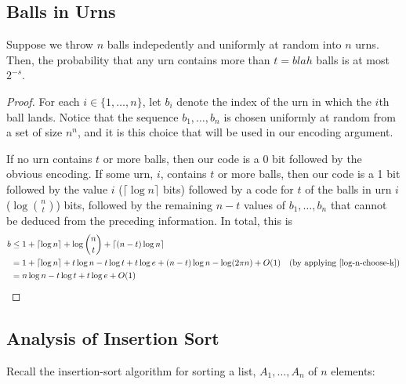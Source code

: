 \documentclass[lotsofwhite]{patmorin}
\begin{document}
\subsection{Balls in Urns}

\begin{thm}
  Suppose we throw $n$ balls indepedently and uniformly at random into $n$
  urns. Then, the probability that any urn contains more than $t=blah$
  balls is at most $2^{-s}$.
\end{thm}

\begin{proof}
  For each $i\in\{1,\ldots,n\}$, let $b_i$ denote the index of the urn in
  which the $i$th ball lands. Notice that the sequence $b_1,\ldots,b_n$
  is chosen uniformly at random from a set of size $n^n$, and it is this
  choice that will be used in our encoding argument.

  If no urn contains $t$ or more balls, then our code is a 0 bit followed
  by the obvious encoding. If some urn, $i$, contains $t$ or more balls,
  then our code is a 1 bit followed by the value $i$ ($\lceil \log
  n\rceil$ bits) followed by a code for $t$ of the balls in urn $i$
  ($\log\binom{n}{t}$) bits, followed by the remaining $n-t$ values of
  $b_1,\ldots,b_n$ that cannot be deduced from the preceding information.
  In total, this is
  \begin{align*}
    b &\le 1 + \lceil\log n\rceil + \log\binom{n}{t} 
           + \lceil(n-t)\log n\rceil \\
     & = 1 + \lceil\log n\rceil + t\log n - t\log t + t\log e  
           + (n-t)\log n - \log(2\pi n) + O(1)
             & \text{(by applying \eqref{log-n-choose-k})} \\
     & = n\log n - t\log t + t\log e + O(1)
  \end{align*}
\end{proof}

\subsection{Analysis of Insertion Sort}

Recall the insertion-sort algorithm for sorting a list, $A_1,\ldots,A_n$
of $n$ elements:

\begin{algorithmic}[1]
     \ENDWHILE
  \ENDFOR
\end{algorithmic}
\end{document}

